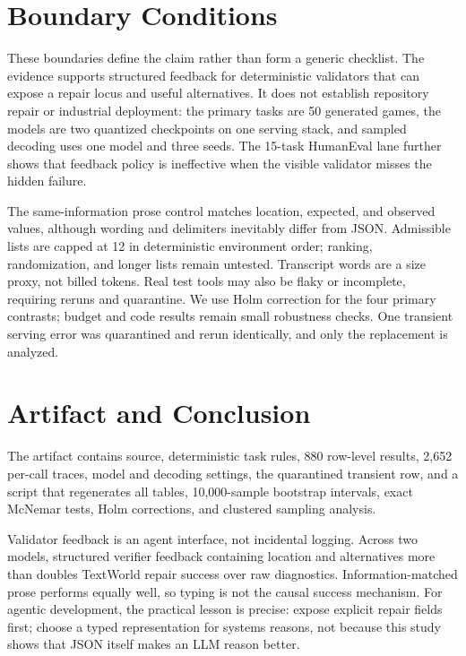 \documentclass[sigconf,review,anonymous]{acmart}
\begin{document}
\section{Boundary Conditions}

These boundaries define the claim rather than form a generic checklist. The
evidence supports structured feedback for deterministic validators that can
expose a repair locus and useful alternatives. It does not establish repository
repair or industrial deployment: the primary tasks are 50 generated games, the
models are two quantized checkpoints on one serving stack, and sampled decoding
uses one model and three seeds. The 15-task HumanEval lane further shows that
feedback policy is ineffective when the visible validator misses the hidden
failure.

The same-information prose control matches location, expected, and observed
values, although wording and delimiters inevitably differ from JSON. Admissible
lists are capped at 12 in deterministic environment order; ranking,
randomization, and longer lists remain untested. Transcript words are a size
proxy, not billed tokens. Real test tools may also be flaky or incomplete,
requiring reruns and quarantine. We use Holm correction for the four primary
contrasts; budget and code results remain small robustness checks. One transient
serving error was quarantined and rerun identically, and only the replacement is
analyzed.

\section{Artifact and Conclusion}

The artifact contains source, deterministic task rules, 880 row-level results,
2,652 per-call traces, model and decoding settings, the quarantined transient
row, and a script that regenerates all tables, 10,000-sample bootstrap intervals,
exact McNemar tests, Holm corrections, and clustered sampling analysis.

Validator feedback is an agent interface, not incidental logging. Across two
models, structured verifier feedback containing location and alternatives more
than doubles TextWorld repair
success over raw diagnostics. Information-matched prose performs equally well,
so typing is not the causal success mechanism. For agentic development, the
practical lesson is precise: expose explicit repair fields first; choose a
typed representation for systems reasons, not because this study shows that
JSON itself makes an LLM reason better.

\balance


\end{document}
